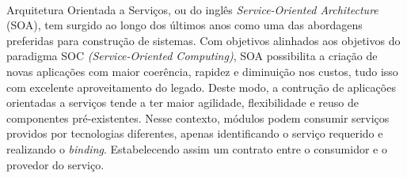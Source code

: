 \paragraph{}
Arquitetura Orientada a Serviços, ou do inglês \textit{Service-Oriented Architecture} (SOA), tem surgido ao longo dos últimos anos como uma das abordagens preferidas para construção de sistemas. Com objetivos alinhados aos objetivos do paradigma SOC \textit{(Service-Oriented Computing)}, SOA possibilita a criação de novas aplicações com maior coerência, rapidez e diminuição nos custos, tudo isso com excelente aproveitamento do legado.
Deste modo, a contrução de aplicações orientadas a serviços tende a ter maior agilidade, flexibilidade e reuso de componentes pré-existentes.
Nesse contexto, módulos podem consumir serviços providos por tecnologias diferentes, apenas identificando o serviço requerido e realizando o \textit{binding}. Estabelecendo assim um contrato entre o consumidor e o provedor do serviço.

\begin{keywords}

\end{keywords}

